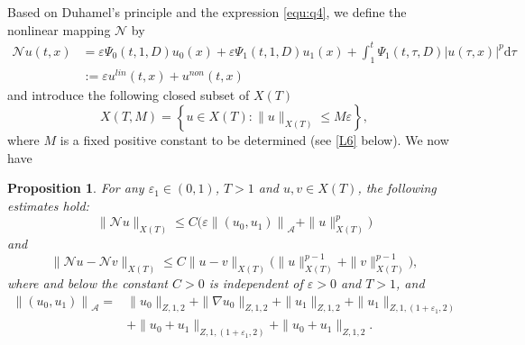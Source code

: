 \documentclass[11pt,twoside]{article}
\newcommand{\ve}{\varepsilon}
\theoremstyle{plain}
\newtheorem{proposition}{Proposition}[section]
\theoremstyle{definition}
\theoremstyle{remark}
\numberwithin{equation}{section}
\begin{document}
Based on Duhamel's principle and the  expression \eqref{equ:q4}, we define the nonlinear mapping $\mathcal{N}$ by
\begin{equation}\label{L2}
\begin{aligned}
\mathcal{N} u(t, x)&=\ve\Psi_{0}(t, 1, D)u_{0}(x)+\ve\Psi_{1}(t, 1, D) u_{1}(x)
+\int_{1}^{t} \Psi_{1}(t, \tau, D)|u(\tau, x)|^{p} \mathrm{d} \tau  \\
&:=\ve u^{lin}(t, x)+u^{non}(t, x)
\end{aligned}
\end{equation}
and introduce the following closed subset of $X(T)$
$$
X(T, M)=\left\{u \in X(T):\|u\|_{X(T)} \leq M\ve\right\},
$$
where $M$ is a fixed positive constant to be determined (see \eqref{L6} below). We now have
\begin{proposition}\label{prop-1}
For any $\varepsilon_1\in(0,1)$, $T>1$ and  $u, v \in X(T)$, the following estimates hold:
\begin{equation}\label{L3}
\|\mathcal{N} u\|_{X(T)} \leq C\big(\ve\left\|\left(u_{0}, u_{1}\right)\right\|_{\mathcal{A}}+\|u\|_{X(T)}^{p}\big)
\end{equation}
and
\begin{equation}\label{L4}
\|\mathcal{N} u-\mathcal{N} v\|_{X(T)} \leq C\|u-v\|_{X(T)}\big(\|u\|_{X(T)}^{p-1}+\|v\|_{X(T)}^{p-1}\big),
\end{equation}
where and below the constant $C>0$ is independent of $\ve>0$ and $T>1$, and
\begin{equation}\label{L5}
\begin{aligned}
\left\|\left(u_{0}, u_{1}\right)\right\|_{\mathcal{A}}=&\|u_0\|_{Z, 1, 2}+\|\nabla u_0\|_{Z, 1, 2}
+\|u_1\|_{Z, 1, 2}+\|u_1\|_{Z, 1, (1+\varepsilon_1, 2)}\\
&+\|u_0+u_1\|_{Z, 1, (1+\varepsilon_1, 2)}+\|u_0+u_1\|_{Z, 1, 2}.
\end{aligned}
\end{equation}
\end{proposition}
\end{document}
